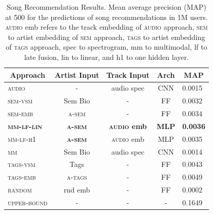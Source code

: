 \begin{table}[]
\centering
\label{tbl:song}
\begin{tabular}{lcccl}
\toprule
\multicolumn{1}{c}{\textbf{Approach}} & \textbf{Artist Input} & \textbf{Track Input} & \textbf{Arch} & \multicolumn{1}{c}{\textbf{MAP}} \\
\midrule
\textsc{audio}                                 & -                     & audio spec        & CNN           & 0.0015                          \\
\textsc{sem-vsm}                               & Sem Bio               & -                    & FF            & 0.0032                          \\
\textsc{sem-emb}                               & \textsc{a-sem}            & -                    & FF            & 0.0034                          \\
\midrule
\textsc{\textbf{mm-lf-lin}}                        & \textsc{\textbf{a-sem}}     & \textbf{\textsc{audio} emb}  & \textbf{MLP} & \textbf{0.0036}                  \\
\textsc{mm-lf-h1}                        & \textsc{\textbf{a-sem}}     & \textsc{audio} emb  & MLP & 0.0035                  \\
\textsc{mm}                                    & Sem Bio               & audio spec        & CNN            & 0.0014                          \\
\midrule
\textsc{tags-vsm}                              & Tags              & -                    & FF            & 0.0043                          \\
\textsc{tags-emb}                              & \textsc{a-tags}           & -                    & FF            & 0.0049                          \\
\midrule
\textsc{random}                                & rnd emb         & -                    & FF            & 0.0002                          \\
\textsc{upper-bound}                           & -                     & -                    & -             & 0.1649                   \\      
\bottomrule
\end{tabular}
\caption[Song Recommendation Results.]{Song Recommendation Results. Mean average precision (MAP) at 500 for the predictions of song recommendations in 1M users. \textsc{audio} emb refers to the track embedding of \textsc{audio} approach, \textsc{sem} to artist embedding of \textsc{sem} approach, \textsc{tags} to artist embedding of \textsc{tags} approach, spec to spectrogram, mm to multimodal, lf to late fusion, lin to linear, and h1 to one hidden layer.}
\end{table}

